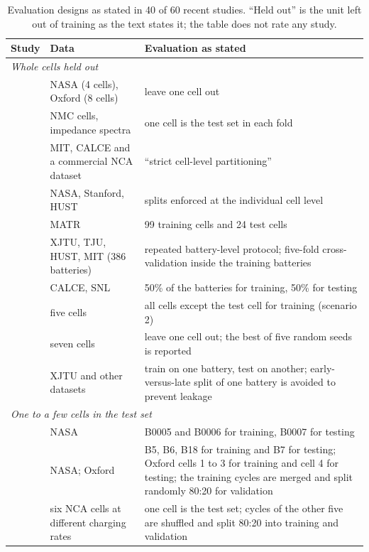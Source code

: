 \documentclass{ieeeaccess}
\begin{document}
\begin{table}[!t]
\caption{Evaluation designs as stated in 40 of 60 recent studies. ``Held out'' is the unit left out of training as the text states it; the table does not rate any study.}
\label{tab:practice}
\centering
\footnotesize
\begin{tabular}{p{}p{}p{}}
\toprule
Study & Data & Evaluation as stated \\
\midrule
\multicolumn{3}{l}{\textit{Whole cells held out}} \\
\cite{aud47} & NASA (4 cells), Oxford (8 cells) & leave one cell out \\
\cite{aud42} & NMC cells, impedance spectra & one cell is the test set in each fold \\
\cite{aud18} & MIT, CALCE and a commercial NCA dataset & ``strict cell-level partitioning'' \\
\cite{aud30} & NASA, Stanford, HUST & splits enforced at the individual cell level \\
\cite{aud53} & MATR & 99 training cells and 24 test cells \\
\cite{aud22} & XJTU, TJU, HUST, MIT (386 batteries) & repeated battery-level protocol; five-fold cross-validation inside the training batteries \\
\cite{aud20} & CALCE, SNL & 50\% of the batteries for training, 50\% for testing \\
\cite{aud06} & five cells & all cells except the test cell for training (scenario 2) \\
\cite{aud19} & seven cells & leave one cell out; the best of five random seeds is reported \\
\cite{wang2024} & XJTU and other datasets & train on one battery, test on another; early-versus-late split of one battery is avoided to prevent leakage \\
\midrule
\multicolumn{3}{l}{\textit{One to a few cells in the test set}} \\
\cite{aud24} & NASA & B0005 and B0006 for training, B0007 for testing \\
\cite{aud32} & NASA; Oxford & B5, B6, B18 for training and B7 for testing; Oxford cells 1 to 3 for training and cell 4 for testing; the training cycles are merged and split randomly 80:20 for validation \\
\cite{aud36} & six NCA cells at different charging rates & one cell is the test set; cycles of the other five are shuffled and split 80:20 into training and validation \\

\end{tabular}
\end{table}
\end{document}
